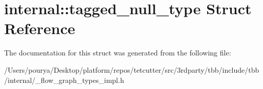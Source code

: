 \hypertarget{structinternal_1_1tagged__null__type}{}\section{internal\+:\+:tagged\+\_\+null\+\_\+type Struct Reference}
\label{structinternal_1_1tagged__null__type}


The documentation for this struct was generated from the following file\+:\begin{DoxyCompactItemize}
\item 
/\+Users/pourya/\+Desktop/platform/repos/tetcutter/src/3rdparty/tbb/include/tbb/internal/\+\_\+flow\+\_\+graph\+\_\+types\+\_\+impl.\+h\end{DoxyCompactItemize}
